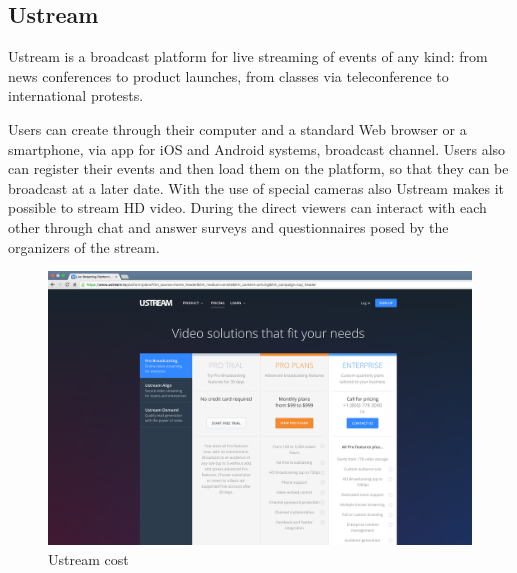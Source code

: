 \subsection{Ustream}
\label{sec:Ustream}
 Ustream is a broadcast platform for live streaming of events of any kind: from news conferences to product launches, from classes via teleconference to international protests.

Users can create through their computer and a standard Web browser or a smartphone, via app for iOS and Android systems, broadcast channel.
Users also can register their events and then load them on the platform, so that they can be broadcast at a later date. With the use of special cameras also Ustream makes it possible to stream HD video.
During the direct viewers can interact with each other through chat and answer surveys and questionnaires posed by the organizers of the stream.

  
 \begin{figure}[!htb]
 \centering
 \includegraphics[width=1.0\linewidth]{images/chapter3/ustream.png}\hfill
 \caption[Ustream cost]{Ustream cost}
 \label{fig:fourV}
\end{figure}